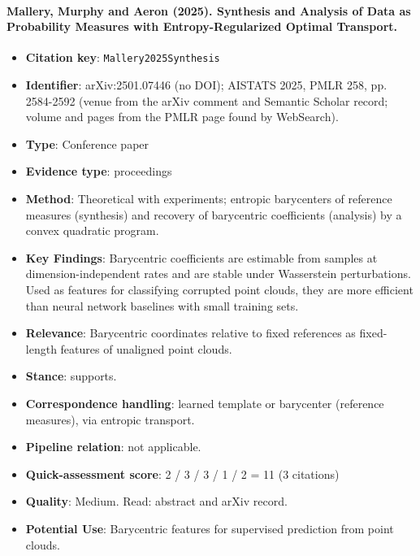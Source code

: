 \documentclass[journal,onecolumn]{IEEEtran}
\begin{document}
\paragraph{Mallery, Murphy and Aeron (2025). Synthesis and Analysis of Data as Probability Measures with Entropy-Regularized Optimal Transport.~\cite{Mallery2025Synthesis}}\mbox{}

\begin{itemize}

\item{} \textbf{Citation key}: \texttt{Mallery2025Synthesis}

\item{} \textbf{Identifier}: arXiv:2501.07446 (no DOI); AISTATS 2025, PMLR 258, pp. 2584-2592 (venue from the arXiv comment and Semantic Scholar record; volume and pages from the PMLR page found by WebSearch).

\item{} \textbf{Type}: Conference paper

\item{} \textbf{Evidence type}: proceedings

\item{} \textbf{Method}: Theoretical with experiments; entropic barycenters of reference measures (synthesis) and recovery of barycentric coefficients (analysis) by a convex quadratic program.

\item{} \textbf{Key Findings}: Barycentric coefficients are estimable from samples at dimension-independent rates and are stable under Wasserstein perturbations. Used as features for classifying corrupted point clouds, they are more efficient than neural network baselines with small training sets.

\item{} \textbf{Relevance}: Barycentric coordinates relative to fixed references as fixed-length features of unaligned point clouds.

\item{} \textbf{Stance}: supports.

\item{} \textbf{Correspondence handling}: learned template or barycenter (reference measures), via entropic transport.

\item{} \textbf{Pipeline relation}: not applicable.

\item{} \textbf{Quick-assessment score}: 2 / 3 / 3 / 1 / 2 = 11 (3 citations)

\item{} \textbf{Quality}: Medium. Read: abstract and arXiv record.

\item{} \textbf{Potential Use}: Barycentric features for supervised prediction from point clouds.

\end{itemize}
\end{document}
